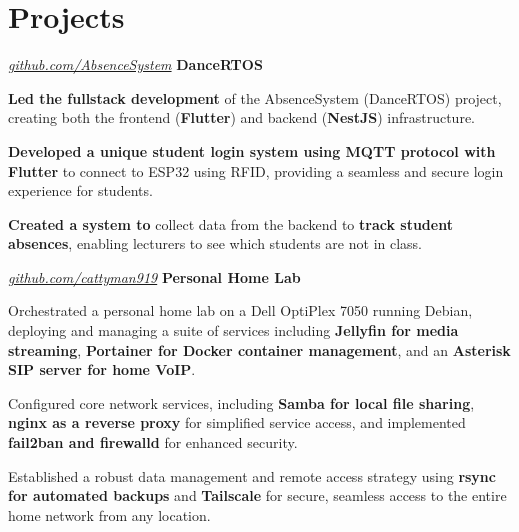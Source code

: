 \documentclass[../main.tex]{subfiles}
\begin{document}
\section{Projects}

\begin{twocolentry}{
    \small
    \textit{\href{https://github.com/cattyman919/AbsenceSystem/tree/main}{github.com/AbsenceSystem}}
}
    \textbf{DanceRTOS}
\end{twocolentry}

\vspace{0.10 cm}
\begin{onecolentry}
\begin{highlights}
    \item \textbf{Led the fullstack development} of the AbsenceSystem (DanceRTOS) project, creating both the frontend (\textbf{Flutter}) and backend (\textbf{NestJS}) infrastructure.
    \item \textbf{Developed a unique student login system using MQTT protocol with Flutter} to connect to ESP32 using RFID, providing a seamless and secure login experience for students.
    \item \textbf{Created a system to} collect data from the backend to \textbf{track student absences}, enabling lecturers to see which students are not in class.
\end{highlights}
\end{onecolentry}

\vspace{0.2 cm}

\begin{twocolentry}{
    \small
    \textit{\href{https://github.com/cattyman919/}{github.com/cattyman919}}
}
    \textbf{Personal Home Lab}
\end{twocolentry}

\vspace{0.10 cm}
\begin{onecolentry}
\begin{highlights}
    \item Orchestrated a personal home lab on a Dell OptiPlex 7050 running Debian, deploying and managing a suite of services including \textbf{Jellyfin for media streaming}, \textbf{Portainer for Docker container management}, and an \textbf{Asterisk SIP server for home VoIP}.
    \item Configured core network services, including \textbf{Samba for local file sharing}, \textbf{nginx as a reverse proxy} for simplified service access, and implemented \textbf{fail2ban and firewalld} for enhanced security.
    \item Established a robust data management and remote access strategy using \textbf{rsync for automated backups} and \textbf{Tailscale} for secure, seamless access to the entire home network from any location.
\end{highlights}
\end{onecolentry}
\end{document}
